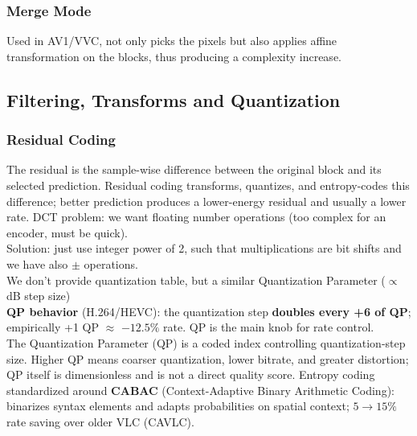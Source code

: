 \subsubsection{Merge Mode}
Used in AV1/VVC, not only picks the pixels but also applies affine transformation on the blocks, thus producing a complexity increase.
\subsection{Filtering, Transforms and Quantization}
\subsubsection{Residual Coding}
The residual is the sample-wise difference between the original block and its selected prediction. Residual coding transforms, quantizes, and entropy-codes this difference; better prediction produces a lower-energy residual and usually a lower rate.
DCT problem: we want floating number operations (too complex for an encoder, must be quick).\\
Solution: just use integer power of 2, such that multiplications are bit shifts and we have also $\pm$ operations.\\
We don't provide quantization table, but a similar Quantization Parameter ($\propto$ dB step size)\\
\textbf{QP behavior} (H.264/HEVC): the quantization step \textbf{doubles every +6 of QP}; empirically +1 QP $\approx$ $-12.5\%$ rate. QP is the main knob for rate control.\\
The Quantization Parameter (QP) is a coded index controlling quantization-step size. Higher QP means coarser quantization, lower bitrate, and greater distortion; QP itself is dimensionless and is not a direct quality score.
Entropy coding standardized around \textbf{CABAC} (Context-Adaptive Binary Arithmetic Coding): binarizes syntax elements and adapts probabilities on spatial context; $5\to15\%$ rate saving over older VLC (CAVLC).
